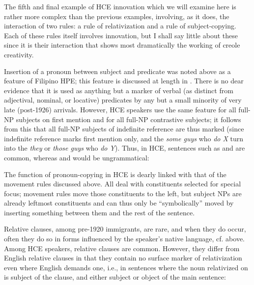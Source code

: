 The fifth and final example of HCE innovation which we will examine here is rather more complex than the previous examples, involving, as it does, the interaction of two rules: a rule of relativization and a rule of subject-copying. Each of these rules itself involves inno\-vation, but I shall say little about these since it is their interaction that shows most dramatically the working of creole creativity.

Insertion of a pronoun between subject and predicate was noted above as a feature of Filipino HPE; this feature is discussed at length in \citet[3.6.1]{BickertonEtAl1976}. There is no dear evidence that it is used as anything but a marker of verbal (as distinct from adjectival, nominal, or locative) predicates by any but a small minority of very late (post-1926) arrivals. However, HCE speakers use the same feature for all full-NP subjects on first mention and for all full-NP contrastive subjects; it follows from this that all full-NP subjects of indefinite refer\-ence are thus marked (since indefinite reference marks first mention only, and the \textit{some guys} who \textit{do X} turn into the \textit{they} or \textit{those guys} who \textit{do Y}). Thus, in HCE, sentences such as  and  are common, whereas  and  would be ungrammatical:

\z

\z

\z

\z

\noindent The function of pronoun-copying in HCE is dearly linked with that of the movement rules discussed above. All deal with constituents selected for special focus; movement rules move those constituents to the left, but subject NPs are already leftmost constituents and can thus only be ``symbolically'' moved by inserting something between them and the rest of the sentence.

Relative clauses, among pre-1920 immigrants, are rare, and when they do occur, often they do so in forms influenced by the speaker's native language, cf.  above. Among HCE speakers, relative clauses are common. However, they differ from English relative clauses in that they contain no surface marker of relativization even where English demands one, i.e., in sentences where the noun relativized on is sub\-ject of the clause, and either subject  or object  of the main sentence:

